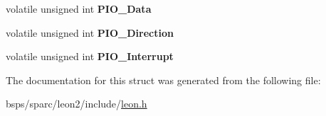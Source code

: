 \begin{DoxyCompactItemize}
\item 
\mbox{\label{structLEON__Register__Map_abcf70267ccdf99571342030e7a3627a2}} 
volatile unsigned int {\bfseries P\+I\+O\+\_\+\+Data}
\item 
\mbox{\label{structLEON__Register__Map_a85fbe6544d1332ae1a4e71faa42f2069}} 
volatile unsigned int {\bfseries P\+I\+O\+\_\+\+Direction}
\item 
\mbox{\label{structLEON__Register__Map_a136c7e5c85e4c433b1caa29be4e51942}} 
volatile unsigned int {\bfseries P\+I\+O\+\_\+\+Interrupt}
\end{DoxyCompactItemize}


The documentation for this struct was generated from the following file\+:\begin{DoxyCompactItemize}
\item 
bsps/sparc/leon2/include/\mbox{\hyperlink{leon2_2include_2leon_8h}{leon.\+h}}\end{DoxyCompactItemize}
